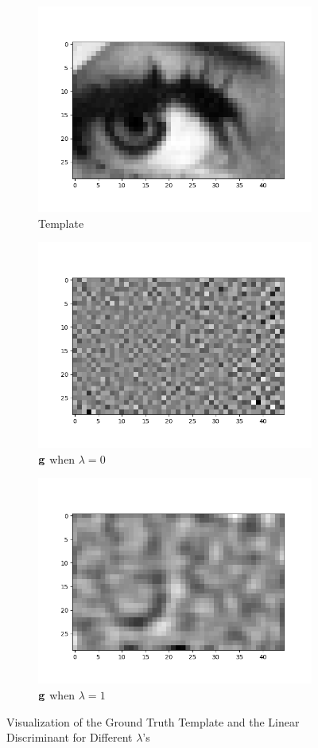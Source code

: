 \documentclass[11pt]{article}
\begin{document}
\begin{figure}[h!]
    \begin{subfigure}{.325\textwidth}
      \centering
      \includegraphics[width=.8\linewidth]{../results/q4_3_gt.png}
      \caption{Template}
    \end{subfigure}
    \begin{subfigure}{.325\textwidth}
      \centering
      \includegraphics[width=.8\linewidth]{../results/q4_3_lambda_0.png}
      \caption{$\mathbf{g}$ when $\lambda=0$}
    \end{subfigure}
    \begin{subfigure}{.325\textwidth}
      \centering
      \includegraphics[width=.8\linewidth]{../results/q4_3_lambda_1.png}
      \caption{$\mathbf{g}$ when $\lambda=1$}
    \end{subfigure}\hfill
    \caption{Visualization of the Ground Truth Template and the Linear Discriminant for Different $\lambda$'s}
    \label{fig:q4.3.1}
\end{figure}
\end{document}
